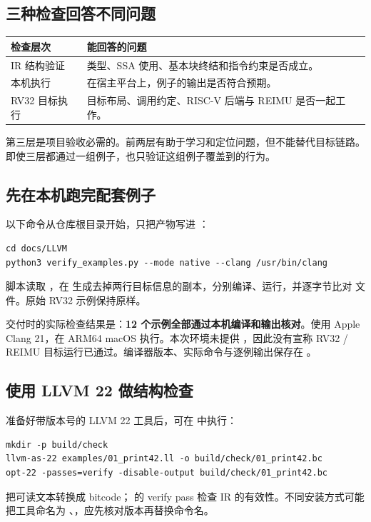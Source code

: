 
\subsection{三种检查回答不同问题}
\begin{tabularx}{\linewidth}{@{}p{35mm}Y@{}}
\toprule
检查层次 & 能回答的问题 \\
\midrule
IR 结构验证 & 类型、SSA 使用、基本块终结和指令约束是否成立。\\
本机执行 & 在宿主平台上，例子的输出是否符合预期。\\
RV32 目标执行 & 目标布局、调用约定、RISC-V 后端与 REIMU 是否一起工作。\\
\bottomrule
\end{tabularx}
第三层是项目验收必需的。前两层有助于学习和定位问题，但不能替代目标链路。即使三层都通过一组例子，也只验证这组例子覆盖到的行为。

\subsection{先在本机跑完配套例子}
以下命令从仓库根目录开始，只把产物写进 ：
\begin{lstlisting}[language={},numbers=none]
cd docs/LLVM
python3 verify_examples.py --mode native --clang /usr/bin/clang
\end{lstlisting}
脚本读取 ，在  生成去掉两行目标信息的副本，分别编译、运行，并逐字节比对  文件。原始 RV32 示例保持原样。

交付时的实际检查结果是：\textbf{12 个示例全部通过本机编译和输出核对}。使用 Apple Clang 21，在 ARM64 macOS 执行。本次环境未提供 ，因此没有宣称 RV32 / REIMU 目标运行已通过。编译器版本、实际命令与逐例输出保存在 。

\subsection{使用 LLVM 22 做结构检查}
准备好带版本号的 LLVM 22 工具后，可在  中执行：
\begin{lstlisting}[language={},numbers=none]
mkdir -p build/check
llvm-as-22 examples/01_print42.ll -o build/check/01_print42.bc
opt-22 -passes=verify -disable-output build/check/01_print42.bc
\end{lstlisting}
 把可读文本转换成 bitcode； 的 verify pass 检查 IR 的有效性。不同安装方式可能把工具命名为 、，应先核对版本再替换命令名。

